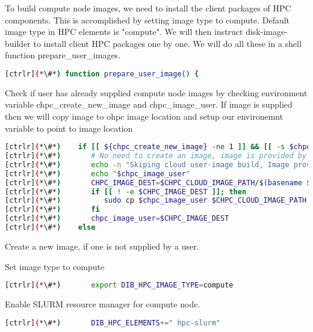 	To build compute node images, we need to install the client packages of HPC components. This is accomplished by setting image type to compute. Default image type in HPC elements is "compute". We will then instruct disk-image-builder to install client HPC packages one by one. We will do all these in a shell function prepare\_user\_images.

\begin{lstlisting}[language=bash,keywords={}]
[ctrlr](*\#*) function prepare_user_image() {
\end{lstlisting} 

	Check if user has already supplied compute node images by checking environment variable chpc\_create\_new\_image and chpc\_image\_user. If image is supplied then we will copy image to ohpc image location and setup our environemnt variable to point to image location 
\begin{lstlisting}[language=bash,keywords={}]
[ctrlr](*\#*)    if [[ ${chpc_create_new_image} -ne 1 ]] && [[ -s $chpc_image_user ]]; then
[ctrlr](*\#*)       # No need to create an image, image is provided by user
[ctrlr](*\#*)       echo -n "Skiping cloud user-image build, Image provided:"
[ctrlr](*\#*)       echo "$chpc_image_user"
[ctrlr](*\#*)       CHPC_IMAGE_DEST=$CHPC_CLOUD_IMAGE_PATH/$(basename $chpc_image_user)
[ctrlr](*\#*)       if [[ ! -e $CHPC_IMAGE_DEST ]]; then
[ctrlr](*\#*)          sudo cp $chpc_image_user $CHPC_CLOUD_IMAGE_PATH
[ctrlr](*\#*)       fi
[ctrlr](*\#*)       chpc_image_user=$CHPC_IMAGE_DEST
[ctrlr](*\#*)    else
\end{lstlisting} 


	Create a new image, if one is not supplied by a user. 	
	
	Set image type to compute  

\begin{lstlisting}[language=bash,keywords={}]
[ctrlr](*\#*)       export DIB_HPC_IMAGE_TYPE=compute
\end{lstlisting} 

	Enable SLURM resource manager for compute node.


\begin{lstlisting}[language=bash,keywords={}]
[ctrlr](*\#*)       DIB_HPC_ELEMENTS+=" hpc-slurm"
\end{lstlisting} 


